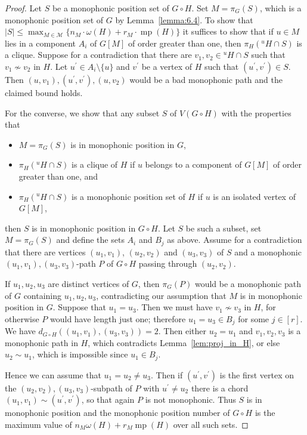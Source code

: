 \documentclass[12pt]{article}
\DeclareMathOperator {\mono} {mp}
\begin{document}
\begin{proof}  
Let $S$ be a monophonic position set of $G\circ H$. Set $M = \pi _G(S)$, which is a monophonic position set of $G$ by Lemma~\ref{lemma:6.4}. To show that $|S| \leq \max_{M\in \mathcal{M}}\{n_M\cdot\omega(H)+ r_M\cdot \mono(H)\} $ it suffices to show that if $u \in M$ lies in a component $A_i$ of $G[M]$ of order greater than one, then $\pi _H(^uH \cap S)$ is a clique. Suppose for a contradiction that there are $v_1,v_2 \in {}^uH \cap S$ such that $v_1 \not \sim v_2$ in $H$. Let $u^{\prime } \in A_i \setminus \{ u\}$ and $v^{\prime }$ be a vertex of $H$ such that $(u^{\prime },v^{\prime }) \in S$. Then $(u,v_1),(u^{\prime },v^{\prime }),(u,v_2)$ would be a bad monophonic path and the claimed bound holds.

For the converse, we show that any subset $S$ of $V(G \circ H)$ with the properties that \begin{itemize}
    \item $M = \pi _G(S)$ is in monophonic position in $G$,
    \item $\pi _H(^uH \cap S)$ is a clique of $H$ if $u$ belongs to a component of $G[M]$ of order greater than one, and
    \item $\pi _H(^uH \cap S)$ is a monophonic position set of $H$ if $u$ is an isolated vertex of $G[M]$,
\end{itemize}  
then $S$ is in monophonic position in $G \circ H$. Let $S$ be such a subset, set $M = \pi _G(S)$ and define the sets $A_i$ and $B_j$ as above. Assume for a contradiction that there are vertices $(u_1,v_1)$, $(u_2,v_2)$ and $(u_3,v_3)$ of $S$ and a monophonic $(u_1,v_1),(u_3,v_3)$-path $P$ of $G \circ H$ passing through $(u_2,v_2)$.

If $u_1,u_2,u_3$ are distinct vertices of $G$, then $\pi _G(P)$ would be a monophonic path of $G$ containing $u_1,u_2,u_3$, contradicting our assumption that $M$ is in monophonic position in $G$. Suppose that $u_1 = u_3$. Then we must have $v_1 \not \sim v_3$ in $H$, for otherwise $P$ would have length just one; therefore $u_1 = u_3 \in B_j$ for some $j \in [r]$. We have $d_{G \circ H}((u_1,v_1),(u_3,v_3)) = 2$. Then either $u_2 = u_1$ and $v_1,v_2,v_3$ is a monophonic path in $H$, which contradicts Lemma~\ref{lem:proj_in_H}, or else $u_2 \sim u_1$, which is impossible since $u_1 \in B_j$. 

Hence we can assume that $u_1 = u_2 \neq u_3$. Then if $(u^{\prime },v^{\prime })$ is the first vertex on the $(u_2,v_2),(u_3,v_3)$-subpath of $P$ with $u^{\prime } \neq u_2$ there is a chord $(u_1,v_1) \sim (u^{\prime },v^{\prime })$, so that again $P$ is not monophonic. Thus $S$ is in monophonic position and the monophonic position number of $G \circ H$ is the maximum value of $n_M\omega (H)+r_M\mono (H)$ over all such sets.
\end{proof}
\end{document}

